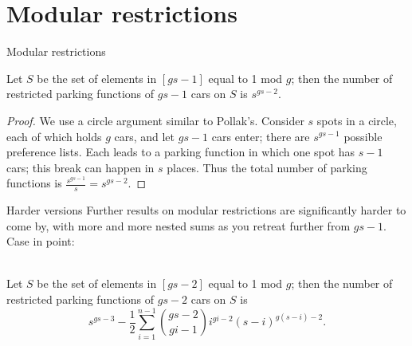 \documentclass[table, dvipsnames]{beamer}
\begin{document}
\section{Modular restrictions}

\begin{frame}{Modular restrictions}
    \begin{theorem}
        Let $S$ be the set of elements in $[gs-1]$ equal to 1 mod $g$; then the number of restricted parking functions of $gs-1$ cars on $S$ is $s^{gs-2}.$
    \end{theorem}\pause
    \begin{proof}
        We use a circle argument similar to Pollak's. Consider $s$ spots in a circle, each of which holds $g$ cars, and let $gs-1$ cars enter; there are $s^{gs-1}$ possible preference lists. Each leads to a parking function in which one spot has $s-1$ cars; this break can happen in $s$ places. Thus the total number of parking functions is $\frac{s^{gs-1}}{s}=s^{gs-2}.$
    \end{proof}
\end{frame}

\begin{frame}{Harder versions}
    Further results on modular restrictions are significantly harder to come by, with more and more nested sums as you retreat further from $gs-1.$ Case in point:\pause\\~

    \begin{theorem}
        Let $S$ be the set of elements in $[gs-2]$ equal to 1 mod $g$; then the number of restricted parking functions of $gs-2$ cars on $S$ is $$s^{gs-3}-\frac{1}{2}\sum_{i=1}^{n-1}\binom{gs-2}{gi-1}i^{gi-2}(s-i)^{g(s-i)-2}.$$
    \end{theorem}    
\end{frame}
\end{document}
